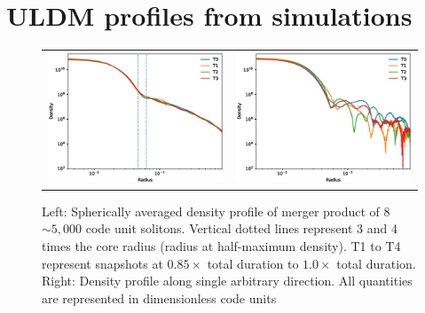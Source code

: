 \documentclass[a4paper,11pt]{article}
\begin{document}
\section{ULDM profiles from simulations}\label{sec:sim_comparison}


\begin{figure}
\begin{tabular}{cc}
{\includegraphics[scale = 0.55, trim={1.5cm 0 0 1cm}]{pics/combined3.eps}} &
{\includegraphics[scale = 0.55, trim={2cm 0 0 1cm}]{pics/singles.eps}}
\end{tabular}
\caption{Left: Spherically averaged density profile of merger product of 8 $\sim 5,000$ code unit solitons. Vertical dotted lines represent 3 and 4 times the core radius (radius at half-maximum density). T1 to T4 represent snapshots at $0.85 \times$ total duration to $1.0 \times$ total duration. 
Right: Density profile along single arbitrary direction. All quantities are represented in dimensionless code units}\label{fig:pul}
\end{figure}
\end{document}

